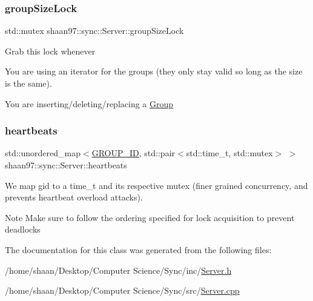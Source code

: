 \subsubsection{\texorpdfstring{group\+Size\+Lock}{groupSizeLock}}
{\footnotesize\ttfamily std\+::mutex shaan97\+::sync\+::\+Server\+::group\+Size\+Lock\hspace{0.3cm}{\ttfamily [private]}}

Grab this lock whenever
\begin{DoxyEnumerate}
\item You are using an iterator for the groups (they only stay valid so long as the size is the same).
\item You are inserting/deleting/replacing a \hyperlink{classshaan97_1_1sync_1_1_group}{Group} 
\end{DoxyEnumerate}\mbox{\label{classshaan97_1_1sync_1_1_server_a031f6b51241c6440b6bc452ddcd124f5}} 
\subsubsection{\texorpdfstring{heartbeats}{heartbeats}}
{\footnotesize\ttfamily std\+::unordered\+\_\+map$<$\hyperlink{namespaceshaan97_1_1sync_a34cebf175d27dfc3d82f24608f7043c1}{G\+R\+O\+U\+P\+\_\+\+ID}, std\+::pair$<$std\+::time\+\_\+t, std\+::mutex$>$ $>$ shaan97\+::sync\+::\+Server\+::heartbeats\hspace{0.3cm}{\ttfamily [private]}}

We map gid to a time\+\_\+t and it\textquotesingle{}s respective mutex (finer grained concurrency, and prevents heartbeat overload attacks).

\begin{DoxyNote}{Note}
Make sure to follow the ordering specified for lock acquisition to prevent deadlocks 
\end{DoxyNote}


The documentation for this class was generated from the following files\+:\begin{DoxyCompactItemize}
\item 
/home/shaan/\+Desktop/\+Computer Science/\+Sync/inc/\hyperlink{_server_8h}{Server.\+h}\item 
/home/shaan/\+Desktop/\+Computer Science/\+Sync/src/\hyperlink{_server_8cpp}{Server.\+cpp}\end{DoxyCompactItemize}
